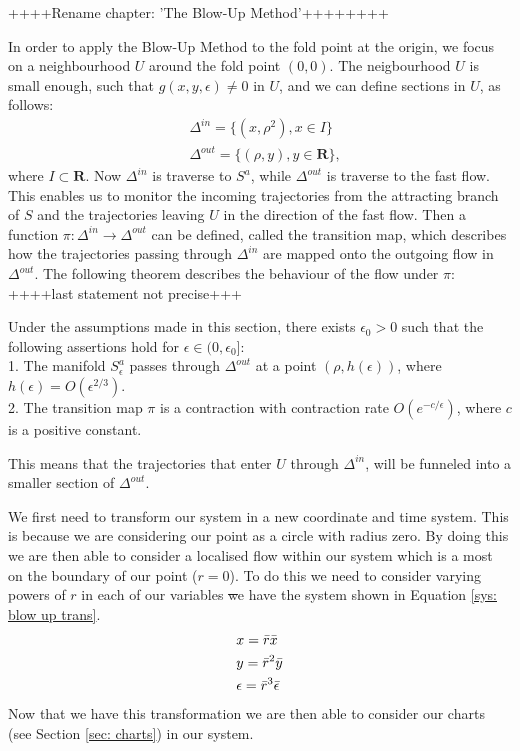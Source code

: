 ++++Rename chapter: 'The Blow-Up Method'++++++++

In order to apply the Blow-Up Method to the fold point at the origin, we focus on a neighbourhood $U$ around the fold point $(0,0)$. 
The neigbourhood $U$ is small enough, such that $g(x,y, \epsilon) \neq 0$ in $U$, and we can define sections in $U$, as follows:
\begin{align*}
&\Delta ^{in} = \{ (x, \rho^2), x \in I \} \\
&\Delta ^{out} = \{ (\rho, y), y \in \mathbf{R} \},
\end{align*}
where $I \subset \mathbf{R}$. Now $\Delta^{in}$ is traverse to $S^a$, while $\Delta^{out}$ is traverse to the fast flow. This enables us to monitor the incoming trajectories from the attracting branch of $S$ and the trajectories leaving $U$ in the direction of the fast flow.
Then a function $\pi : \Delta^{in} \to \Delta^{out}$ can be defined, called the transition map, which describes how the trajectories passing through $\Delta^{in}$ are mapped onto the outgoing flow in $\Delta^{out}$.  
The following theorem describes the behaviour of the flow under $\pi$: ++++last statement not precise+++
\begin{theorem}%
Under the assumptions made in this section, there exists $ \epsilon_0 >0$ such that the following assertions hold for $\epsilon \in (0, \epsilon_0]$:\\
1. The manifold $S_\epsilon^a$ passes through $\Delta^{out}$ at a point $(\rho, h(\epsilon))$, where $h(\epsilon) = O(\epsilon^{2/3})$.\\
2. The transition map $\pi$ is a contraction with contraction rate $O(e^{-c/\epsilon})$, where $c$ is a positive constant.
\end{theorem}
This means that the trajectories that enter $U$ through $\Delta^{in}$, will be funneled into a smaller section of $\Delta^{out}$. 





We first need to transform our system in a new coordinate and time system. This is because we are considering our point as a circle with radius zero. By doing this we are then able to consider a localised flow within our system which is a most on the boundary of our point ($r=0$). To do this we need to consider varying powers of $r$ in each of our variables \st we have the system shown in Equation \ref{sys: blow up trans}.  
\begin{subequations}
    \begin{align}
        &x=\Bar{r}\Bar{x}  \label{sys: blow up trans x}\\
        &y=\Bar{r}^2\Bar{y} \label{sys: blow up trans y}\\ 
        &\epsilon=\bar{r}^3\bar{\epsilon} \label{sys: blow up trans z}
    \end{align}  
    \label{sys: blow up trans}
\end{subequations}
Now that we have this transformation we are then able to consider our charts (see Section \ref{sec: charts}) in our system.

